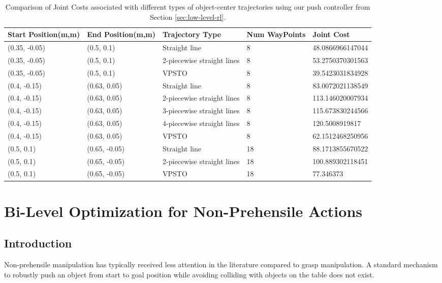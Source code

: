\begin{table}
\centering
\caption{Comparison of Joint Costs associated with different types of object-center trajectories using our push controller from Section \ref{sec:low-level-rl}.} \label{table: straight-line-vs-joint}
\scriptsize
\begin{tabular}{|p{2cm}|p{2cm}|p{4cm}|p{2cm}|p{3cm}|}\hline
 Start Position(m,m) & End Position(m,m) & Trajectory Type & Num WayPoints & Joint Cost
\\ \hline
(0.35, -0.05) & (0.5, 0.1) & Straight line & 8	& 48.0866966147044 
\\ \hline
(0.35, -0.05) & (0.5, 0.1)	& 2-piecewise straight lines & 8 & 53.2750370301563
\\ \hline
(0.35, -0.05) & (0.5, 0.1)	& VPSTO		& 8	& 	39.5423031834928
\\ \hline
(0.4, -0.15) & (0.63, 0.05)	& Straight line	& 8	& 83.0072021138549
\\ \hline
(0.4, -0.15) & (0.63, 0.05)	& 2-piecewise straight lines & 8 & 113.146020007934
\\ \hline
(0.4, -0.15) & (0.63, 0.05)	& 3-piecewise straight lines & 8 & 115.673830244566
\\ \hline
(0.4, -0.15) & (0.63, 0.05) & 4-piecewise straight lines & 8 & 120.5008919817
\\ \hline
(0.4, -0.15) & (0.63, 0.05)	& VPSTO	& 8	& 62.1512468250956
\\ \hline
(0.5, 0.1)	& (0.65, -0.05)	& Straight line	& 18 & 88.1713855670522
\\ \hline
(0.5, 0.1)	& (0.65, -0.05)	& 2-piecewise straight lines & 18 & 100.889302118451
\\ \hline
(0.5, 0.1)	& (0.65, -0.05)	& VPSTO & 18 & 77.346373
\\ \hline
\end{tabular}
\normalsize
\vspace{-0.4cm}
\end{table}

\section{Bi-Level Optimization for Non-Prehensile Actions}\label{sec:bi-level-method}

\subsection{Introduction}
 Non-prehensile manipulation has typically received less attention in the literature compared to grasp manipulation. A standard mechanism to robustly push an object from start to goal position while avoiding colliding with objects on the table does not exist. 

